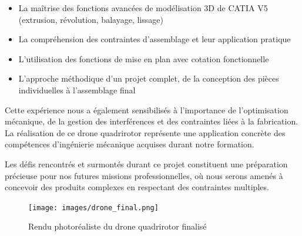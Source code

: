 \documentclass[a4paper,12pt]{report}
\begin{document}
\begin{itemize}
    \item La maîtrise des fonctions avancées de modélisation 3D de CATIA V5 (extrusion, révolution, balayage, lissage)
    \item La compréhension des contraintes d'assemblage et leur application pratique
    \item L'utilisation des fonctions de mise en plan avec cotation fonctionnelle
    \item L'approche méthodique d'un projet complet, de la conception des pièces individuelles à l'assemblage final
\end{itemize}

Cette expérience nous a également sensibilisés à l'importance de l'optimisation mécanique, de la gestion des interférences et des contraintes liées à la fabrication. La réalisation de ce drone quadrirotor représente une application concrète des compétences d'ingénierie mécanique acquises durant notre formation.

Les défis rencontrés et surmontés durant ce projet constituent une préparation précieuse pour nos futures missions professionnelles, où nous serons amenés à concevoir des produits complexes en respectant des contraintes multiples.

\begin{figure}[H]
    \centering
    \texttt{[image: images/drone\_final.png]}
    \caption{Rendu photoréaliste du drone quadrirotor finalisé}
    \label{fig:rendu_final}
\end{figure}
\end{document}
